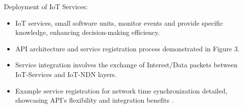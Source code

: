 \documentclass[a0paper,portrait]{baposter}
\begin{document}
\begin{poster}
{    Deployment of IoT Services:
	\begin{itemize}[leftmargin=5.5mm, rightmargin=5.5mm]
        \item IoT services, small software units, monitor events and provide specific knowledge, enhancing decision-making efficiency.
		\item API architecture and service registration process demonstrated in Figure 3.
		\item Service integration involves the exchange of Interest/Data packets between IoT-Services and IoT-NDN layers.
		\item Example service registration for network time synchronization detailed, showcasing API's flexibility and integration benefits  \cite{zhang2010named}.
	\end{itemize}
		\vspace{0.5em}
}




\end{poster}
\end{document}
